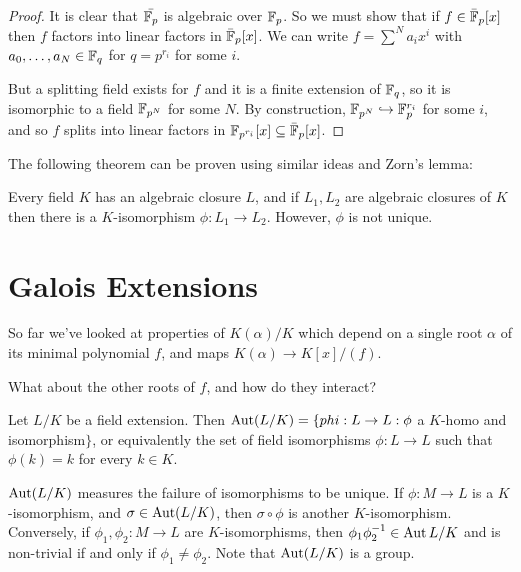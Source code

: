 \documentclass[10pt,a4paper]{article}
\begin{document}
\begin{proof}
It is clear that $\bar{\mathbb{F}_p}$ is algebraic over $\mathbb{F}_p$. So we must show that if $f \in \bar{\mathbb{F}}_p[x]$ then $f$ factors into linear factors in $\bar{\mathbb{F}}_p[x]$. We can write $f = \sum^N a_i x^i$ with $a_0, \ldots, a_N \in \mathbb{F}_q$ for $q=p^{r_i}$ for some $i$.

But a splitting field exists for $f$ and it is a finite extension of $\mathbb{F}_q$, so it is isomorphic to a field $\mathbb{F}_{p^N}$ for some $N$. By construction, $\mathbb{F}_{p^N} \hookrightarrow \mathbb{F}_p^{r_i}$ for some $i$, and so $f$ splits into linear factors in $\mathbb{F}_{p^{r_i}}[x] \subseteq \bar{\mathbb{F}}_p[x]$.
\end{proof}
The following theorem can be proven using similar ideas and Zorn's lemma:
\begin{theorem}
Every field $K$ has an algebraic closure $L$, and if $L_1, L_2$ are algebraic closures of $K$ then there is a $K$-isomorphism $\phi:L_1\to L_2$. However, $\phi$ is not unique.
\end{theorem}

\section{Galois Extensions}
So far we've looked at properties of $K(\alpha)/K$ which depend on a single root $\alpha$ of its minimal polynomial $f$, and maps $K(\alpha) \to K[x]/(f)$.

What about the other roots of $f$, and how do they interact?

Let $L/K$ be a field extension. Then $\operatorname{Aut}(L/K) = \{phi : L \to L : \phi $ a $K$-homo and isomorphism$\}$, or equivalently the set of field isomorphisms $\phi:L\to L$ such that $\phi(k) = k$ for every $k \in K$.

$\operatorname{Aut}(L/K)$ measures the failure of isomorphisms to be unique. If $\phi : M \to L$ is a $K$-isomorphism, and $\sigma \in \operatorname{Aut}(L/K)$, then $\sigma \circ \phi$ is another $K$-isomorphism. Conversely, if $\phi_1, \phi_2: M \to L$ are $K$-isomorphisms, then $\phi_1 \phi_2^{-1} \in \operatorname{Aut}{L/K}$ and is non-trivial if and only if $\phi_1 \neq \phi_2$. Note that $\operatorname{Aut}(L/K)$ is a group.
\end{document}
